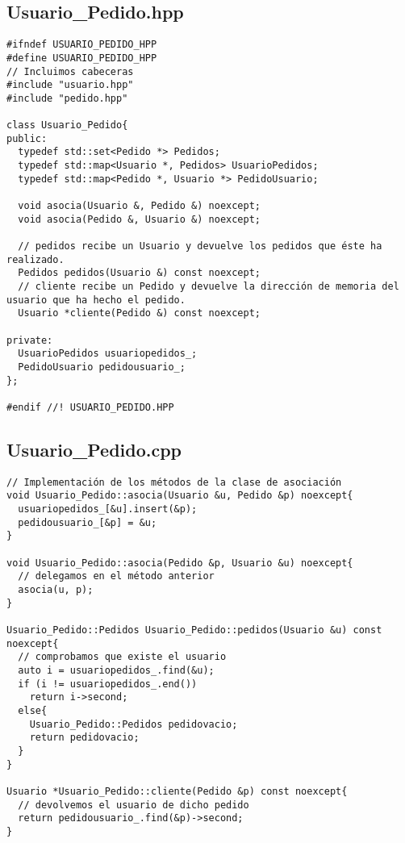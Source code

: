 \subsection{Usuario\_Pedido.hpp}
\begin{verbatim}
#ifndef USUARIO_PEDIDO_HPP
#define USUARIO_PEDIDO_HPP
// Incluimos cabeceras
#include "usuario.hpp"
#include "pedido.hpp"

class Usuario_Pedido{
public:
  typedef std::set<Pedido *> Pedidos;
  typedef std::map<Usuario *, Pedidos> UsuarioPedidos;
  typedef std::map<Pedido *, Usuario *> PedidoUsuario;

  void asocia(Usuario &, Pedido &) noexcept;
  void asocia(Pedido &, Usuario &) noexcept;

  // pedidos recibe un Usuario y devuelve los pedidos que éste ha realizado.
  Pedidos pedidos(Usuario &) const noexcept;
  // cliente recibe un Pedido y devuelve la dirección de memoria del usuario que ha hecho el pedido.
  Usuario *cliente(Pedido &) const noexcept;

private:
  UsuarioPedidos usuariopedidos_;
  PedidoUsuario pedidousuario_;
};

#endif //! USUARIO_PEDIDO.HPP
\end{verbatim}

\subsection{Usuario\_Pedido.cpp}
\begin{verbatim}
// Implementación de los métodos de la clase de asociación
void Usuario_Pedido::asocia(Usuario &u, Pedido &p) noexcept{
  usuariopedidos_[&u].insert(&p);
  pedidousuario_[&p] = &u;
}

void Usuario_Pedido::asocia(Pedido &p, Usuario &u) noexcept{
  // delegamos en el método anterior
  asocia(u, p);
}

Usuario_Pedido::Pedidos Usuario_Pedido::pedidos(Usuario &u) const noexcept{
  // comprobamos que existe el usuario
  auto i = usuariopedidos_.find(&u);
  if (i != usuariopedidos_.end())
    return i->second;
  else{
    Usuario_Pedido::Pedidos pedidovacio;
    return pedidovacio;
  }
}

Usuario *Usuario_Pedido::cliente(Pedido &p) const noexcept{
  // devolvemos el usuario de dicho pedido
  return pedidousuario_.find(&p)->second;
}
\end{verbatim}